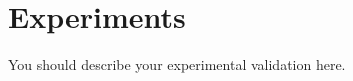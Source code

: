 \section{Experiments}
\label{sec:thesis_experiments}

You should describe your experimental validation here.
